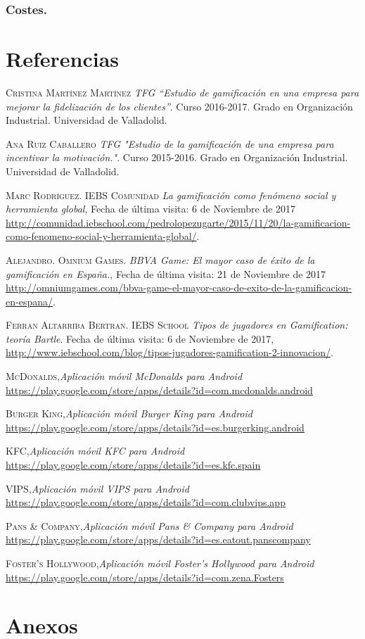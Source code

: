 \documentclass[twoside]{report}
\begin{document}
\subsection{Costes.}
\lipsum[1-2500]

\clearpage
\chapter{Referencias}
\begin{thebibliography}{a} 

 \textsc{Cristina Martínez Martínez} \textit{TFG “Estudio de gamificación en una empresa para mejorar la fidelización de los clientes”}. Curso 2016-2017. Grado en Organización Industrial. Universidad de Valladolid. 

 \textsc{Ana Ruiz Caballero} \textit{TFG "Estudio de la gamificación de una empresa para incentivar la motivación."}. Curso 2015-2016. Grado en Organización Industrial. Universidad de Valladolid. 

 \textsc{Marc Rodríguez. IEBS Comunidad} \textit{La gamificación como fenómeno social y herramienta global}, Fecha de última visita: 6 de Noviembre de 2017 \url{http://comunidad.iebschool.com/pedrolopezugarte/2015/11/20/la-gamificacion-como-fenomeno-social-y-herramienta-global/}.  

 \textsc{Alejandro. Omnium Games.} \textit{BBVA Game: El mayor caso de éxito de la gamificación en España.}, Fecha de última visita: 21 de Noviembre de 2017 \url{http://omniumgames.com/bbva-game-el-mayor-caso-de-exito-de-la-gamificacion-en-espana/}.  

 \textsc{Ferran Altarriba Bertran. IEBS School} \textit{Tipos de jugadores en Gamification: teoría Bartle}. Fecha de última visita: 6 de Noviembre de 2017, \url{http://www.iebschool.com/blog/tipos-jugadores-gamification-2-innovacion/}.  

 \textsc{McDonalds},\textit{Aplicación móvil McDonalds para Android} \url{https://play.google.com/store/apps/details?id=com.mcdonalds.android}


 \textsc{Burger King},\textit{Aplicación móvil Burger King para Android} \url{https://play.google.com/store/apps/details?id=es.burgerking.android}

 \textsc{KFC},\textit{Aplicación móvil KFC para Android} \url{https://play.google.com/store/apps/details?id=es.kfc.spain}

 \textsc{VIPS},\textit{Aplicación móvil VIPS para Android} \url{https://play.google.com/store/apps/details?id=com.clubvips.app}

 \textsc{Pans \& Company},\textit{Aplicación móvil Pans \& Company para Android} \url{https://play.google.com/store/apps/details?id=es.eatout.panscompany}

 \textsc{Foster's Hollywood},\textit{Aplicación móvil Foster's Hollywood para Android} \url{https://play.google.com/store/apps/details?id=com.zena.Fosters}



\end{thebibliography}

\chapter{Anexos}
\end{document}

